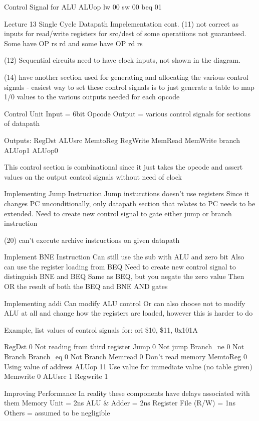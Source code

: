 \documentclass{article}
\begin{document}
	Control Signal for ALU
			ALUop	
		lw	00
		sw	00
		beq	01
		
Lecture 13
	Single Cycle Datapath Impelementation cont.
		(11) not correct as inputs for read/write registers for src/dest of some operatiions not guaranteed. Some have OP rs rd and some have OP rd rs

		(12) Sequential circuits need to have clock inputs, not shown in the diagram.

		(14) have another section used for generating and allocating the various control signals
		- easiest way to set these control signals is to just generate a table to map 1/0 values to the various outputs needed for each opcode

		Control Unit
			Input = 6bit Opcode
			Output = various control signals for sections of datapath

			Outputs:
				RegDst
				ALUsrc
				MemtoReg
				RegWrite
				MemRead
				MemWrite
				branch
				ALUop1
				ALUop0

			This control section is combinational since it just takes the opcode and assert values on the output control signals without need of clock

		Implementing Jump Instruction
			Jump insturctions doesn't use registers
			Since it changes PC unconditionally, only datapath section that relates to PC needs to be extended. 
			Need to create new control signal to gate either jump or branch instruction

		(20) can't execute archive instructions on given datapath 

		Implement BNE Instruction
			Can still use the sub with ALU and zero bit
			Also can use the register loading from BEQ
			Need to create new control signal to distinguish BNE and BEQ
				Same as BEQ, but you negate the zero value
			Then OR the result  of both the BEQ and BNE AND gates

		Implementing addi
			Can modify ALU control
			Or can also choose not to modify ALU at all and change how the registers are loaded, however this is harder to do


		Example, list values of control signals for:   
			ori \$10, \$11, 0x101A

			RegDst		0	Not reading from third register
			Jump		0	Not jump
			Branch\_ne	0	Not Branch
			Branch\_eq	0	Not Branch
			Memread		0	Don't read memory
			MemtoReg	0	Using value of address
			ALUop		11	Use value for immediate value (no table given)
			Memwrite	0
			ALUsrc		1
			Regwrite	1

	Improving Performance
		In reality these components have delays associated with them
		Memory Unit = 2ns
		ALU \& Adder = 2ns
		Register File (R/W) = 1ns
		Others = assumed to be negligible
\end{document}

